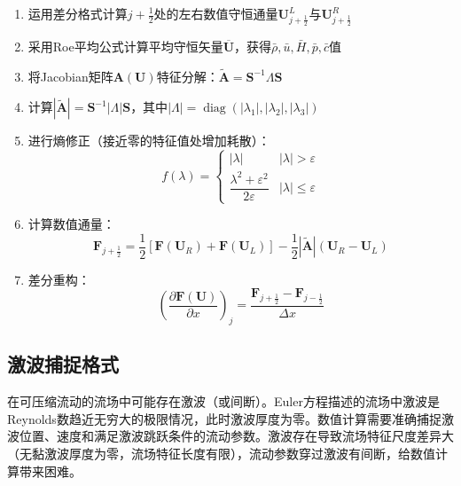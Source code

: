 \documentclass[12pt,a4paper]{article}
\begin{document}
\begin{enumerate}
    \item 运用差分格式计算$j+\frac{1}{2}$处的左右数值守恒通量$\mathbf{U}_{j+\frac{1}{2}}^L$与$\mathbf{U}_{j+\frac{1}{2}}^R$
    
    \item 采用Roe平均公式计算平均守恒矢量$\overline{\mathbf{U}}$，获得$\bar{\rho}, \bar{u}, \bar{H}, \bar{p}, \bar{c}$值
    
    \item 将Jacobian矩阵$\mathbf{A}(\mathbf{U})$特征分解：$\widetilde{\mathbf{A}} = \mathbf{S}^{-1}\Lambda\mathbf{S}$
    
    \item 计算$\left|\widetilde{\mathbf{A}}\right| = \mathbf{S}^{-1}|\Lambda|\mathbf{S}$，其中$|\Lambda| = \operatorname{diag}(|\lambda_1|, |\lambda_2|, |\lambda_3|)$
    
    \item 进行熵修正（接近零的特征值处增加耗散）：
    $$
    f(\lambda) = \begin{cases} 
    |\lambda| & |\lambda| > \varepsilon \\
    \dfrac{\lambda^2 + \varepsilon^2}{2\varepsilon} & |\lambda| \leq \varepsilon 
    \end{cases}
    $$
    
    \item 计算数值通量：
    $$
    \mathbf{F}_{j+\frac{1}{2}} = \frac{1}{2}\left[\mathbf{F}(\mathbf{U}_R) + \mathbf{F}(\mathbf{U}_L)\right] - \frac{1}{2}\left|\widetilde{\mathbf{A}}\right|(\mathbf{U}_R - \mathbf{U}_L)
    $$
    
    \item 差分重构：
    $$
    \left(\frac{\partial \mathbf{F}(\mathbf{U})}{\partial x}\right)_j = \frac{\mathbf{F}_{j+\frac{1}{2}} - \mathbf{F}_{j-\frac{1}{2}}}{\Delta x}
    $$
\end{enumerate}
\subsection{激波捕捉格式}
在可压缩流动的流场中可能存在激波（或间断）。Euler方程描述的流场中激波是Reynolds数趋近无穷大的极限情况，此时激波厚度为零。数值计算需要准确捕捉激波位置、速度和满足激波跳跃条件的流动参数。激波存在导致流场特征尺度差异大（无黏激波厚度为零，流场特征长度有限），流动参数穿过激波有间断，给数值计算带来困难。
\end{document}
